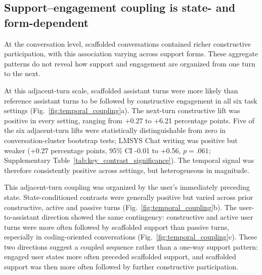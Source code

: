 \subsection{Support--engagement coupling is state- and form-dependent}\label{subsec:2.5}





At the conversation level, scaffolded conversations contained richer constructive participation, with this association varying across support forms. These aggregate patterns do not reveal how support and engagement are organized from one turn to the next. 



At this adjacent-turn scale, scaffolded assistant turns were more likely than reference assistant turns to be followed by constructive engagement in all six task settings (Fig.~\ref{fig:temporal_coupling}a). The next-turn constructive lift was positive in every setting, ranging from +0.27 to +6.21 percentage points. Five of the six adjacent-turn lifts were statistically distinguishable from zero in conversation-cluster bootstrap tests; LMSYS Chat writing was positive but weaker (+0.27 percentage points, 95\% CI -0.01 to +0.56, $p=.061$; Supplementary Table~\ref{tab:key_contrast_significance}). The temporal signal was therefore consistently positive across settings, but heterogeneous in magnitude.

This adjacent-turn coupling was organized by the user's immediately preceding state. State-conditioned contrasts were generally positive but varied across prior constructive, active and passive turns (Fig.~\ref{fig:temporal_coupling}b). The user-to-assistant direction showed the same contingency: constructive and active user turns were more often followed by scaffolded support than passive turns, especially in coding-oriented conversations (Fig.~\ref{fig:temporal_coupling}c). These two directions suggest a coupled sequence rather than a one-way support pattern: engaged user states more often preceded scaffolded support, and scaffolded support was then more often followed by further constructive participation.




